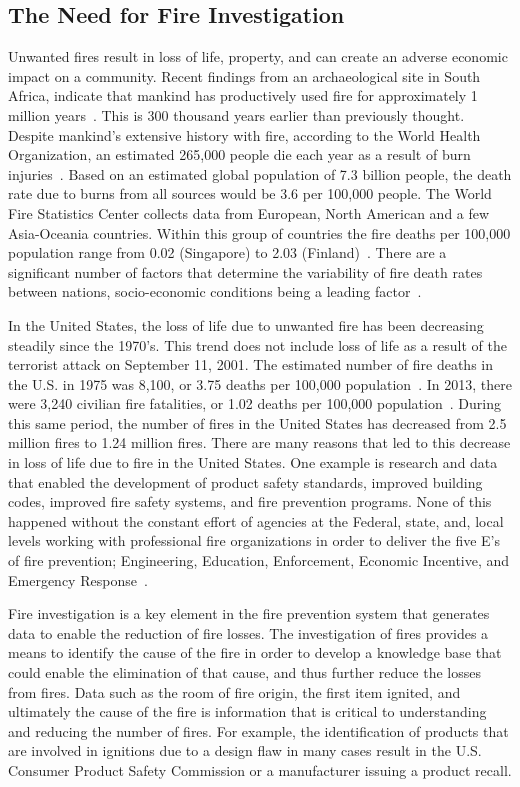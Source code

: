 \documentclass[twoside]{uocthesis}
\begin{document}
\subsection{The Need for Fire Investigation}
Unwanted fires result in loss of life, property, and can create an adverse economic impact on a community.  Recent findings from an archaeological site in South Africa, indicate that mankind has productively used fire for approximately 1 million years~\cite{Berna:2012}.  This is 300 thousand years earlier than previously thought.  Despite mankind's extensive history with fire, according to the World Health Organization, an estimated 265,000 people die each year as a result of burn injuries~\cite{WHO:2014}.  Based on an estimated global population of 7.3 billion people, the death rate due to burns from all sources would be 3.6 per 100,000 people.  The World Fire Statistics Center collects data from European, North American and a few Asia-Oceania countries.  Within this group of countries the fire deaths per 100,000 population range from 0.02 (Singapore) to 2.03 (Finland)~\cite{Climate:2014}. There are a significant number of factors that determine the variability of fire death rates between nations, socio-economic conditions being a leading factor~\cite{WHO:2014}.

In the United States, the loss of life due to unwanted fire has been decreasing steadily since the 1970’s.  This trend does not include loss of life as a result of the terrorist attack on September 11, 2001.  The estimated number of fire deaths in the U.S. in 1975 was 8,100, or 3.75 deaths per 100,000 population~\cite{America_Burning_Revisited}.  In 2013, there were 3,240 civilian fire fatalities, or 1.02 deaths per 100,000 population~\cite{Karter:2014}.  During this same period, the number of fires in the United States has decreased from 2.5 million fires to 1.24 million fires.  There are many reasons that led to this decrease in loss of life due to fire in the United States.  One example is research and data that enabled the development of product safety standards, improved building codes, improved fire safety systems, and fire prevention programs.  None of this happened without the constant effort of agencies at the Federal, state, and, local levels working with professional fire organizations in order to deliver the five E’s of fire prevention; Engineering, Education, Enforcement, Economic Incentive, and Emergency Response~\cite{FEMA:2013}.

Fire investigation is a key element in the fire prevention system that generates data to enable the reduction of fire losses.  The investigation of fires provides a means to identify the cause of the fire in order to develop a knowledge base that could enable the elimination of that cause, and thus further reduce the losses from fires.  Data such as the room of fire origin, the first item ignited, and ultimately the cause of the fire is information that is critical to understanding and reducing the number of fires.  For example, the identification of products that are involved in ignitions due to a design flaw in many cases result in the U.S. Consumer Product Safety Commission or a manufacturer issuing a product recall.
\end{document}
